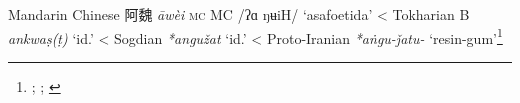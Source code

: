 \begin{etymology}\label{ety:awei}
Mandarin Chinese {阿魏} \textit{āwèi} \textsc{mc} MC /ʔɑ ŋʉiH/ `asafoetida'
< Tokharian B \textit{ankwaṣ(ṭ)} `id.'
< Sogdian \textit{*angužat} `id.'
< Proto-Iranian \textit{*aṅgu-ǰatu-} `resin-gum'\footnote{\textcite{leung_itinerary_2019}; \textcite[353]{laufer_sino-iranica_1919}; \textcite[438]{tremblay_irano-tocharica_2005}}
\end{etymology}